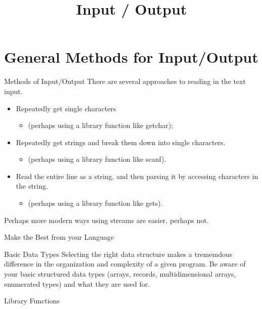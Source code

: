 \documentclass{beamer}
\title{Input / Output}
\begin{document}
\frame{
  \titlepage
}


\section{General Methods for Input/Output}



\begin{frame}[fragile]{Methods of Input/Output}
 There are several approaches to reading in the text input.
 \begin{itemize}
 \item Repeatedly get single characters
   \begin{itemize}
   \item (perhaps using a library function like getchar);
   \end{itemize}
 \item Repeatedly get strings and break them down into single characters.
   \begin{itemize}
   \item (perhaps using a library function like scanf).
   \end{itemize}
 \item Read the entire line as a string, and then parsing it by accessing characters in the string.
   \begin{itemize}
   \item (perhaps using a library function like gets).
   \end{itemize}
\end{itemize}
Perhaps more modern ways using streams are easier, perhaps not.
\end{frame}


\begin{frame}{Make the Best from your Language}

  \begin{block}{Basic Data Types}
    Selecting the right data structure makes a trememdous difference in the organization and complexity of a given program.
    Be aware of your basic structured data types (arrays, records, multidimensional arrays, enumerated types) and what they are used for.
\end{block}

\begin{block}{Library Functions}

\end{block}
\end{frame}
\end{document}
